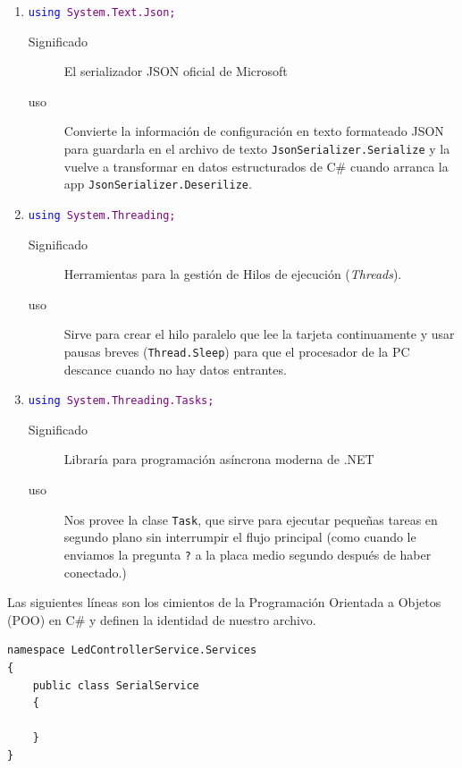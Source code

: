 \documentclass[
10pt, %
a4paper, %
oneside, %
headinclude,footinclude, %
BCOR5mm, %
]{scrartcl}
\begin{document}
\begin{enumerate}
\begin{description}
		\item[uso] Es el que hace toda la "magia" del hardware. Nos provee la clase \texttt{SerialPort}, que es el controlador de bajo nivel para detectar puertos USB conectados, abrir la comunicación, fijar baudios y transmitir/recibir texto.
	\end{description}
	\item \texttt{\textcolor{blue}{using} \textcolor{purple}{System.Text.Json;}}
	\begin{description}
		\item[Significado] El serializador JSON oficial de Microsoft
		\item[uso] Convierte la información de configuración en texto formateado JSON para guardarla en el archivo de texto \texttt{JsonSerializer.Serialize} y la vuelve a transformar en datos estructurados de C\# cuando arranca la app \texttt{JsonSerializer.Deserilize}.
	\end{description}
	\item \texttt{\textcolor{blue}{using} \textcolor{purple}{System.Threading;}}
	\begin{description}
		\item[Significado] Herramientas para la gestión de Hilos de ejecución (\textit{Threads}).
		\item[uso] Sirve para crear el hilo paralelo que lee la tarjeta continuamente y usar pausas breves (\texttt{Thread.Sleep}) para que el procesador de la PC descance cuando no hay datos entrantes.
	\end{description}
		\item \texttt{\textcolor{blue}{using} \textcolor{purple}{System.Threading.Tasks;}}
	\begin{description}
		\item[Significado] Libraría para programación asíncrona moderna de .NET
		\item[uso] Nos provee la clase \texttt{Task}, que sirve para ejecutar pequeñas tareas en segundo plano sin interrumpir el flujo principal (como cuando le enviamos la pregunta \texttt{?} a la placa medio segundo después de haber conectado.)
	\end{description}
\end{enumerate}

Las siguientes líneas son los cimientos de la Programación Orientada a Objetos (POO) en C\# y definen la identidad de nuestro archivo.
\begin{lstlisting}[style=VSCodeDark]
namespace LedControllerService.Services
{
	public class SerialService
	{
		
	}
}
\end{lstlisting}
\end{document}

